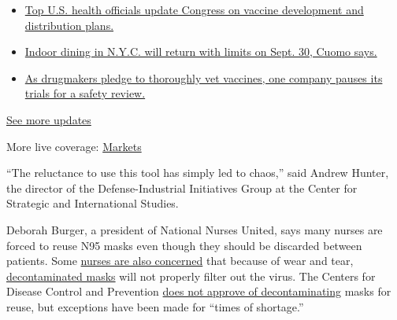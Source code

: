 \begin{itemize}
\tightlist
\item
  \href{https://www.nytimes3xbfgragh.onion/2020/09/09/world/covid-19-coronavirus.html?action=click\&pgtype=Article\&state=default\&region=MAIN_CONTENT_1\&context=storylines_live_updates\#link-279e24e2}{Top
  U.S. health officials update Congress on vaccine development and
  distribution plans.}
\item
  \href{https://www.nytimes3xbfgragh.onion/2020/09/09/world/covid-19-coronavirus.html?action=click\&pgtype=Article\&state=default\&region=MAIN_CONTENT_1\&context=storylines_live_updates\#link-792ae257}{Indoor
  dining in N.Y.C. will return with limits on Sept. 30, Cuomo says.}
\item
  \href{https://www.nytimes3xbfgragh.onion/2020/09/09/world/covid-19-coronavirus.html?action=click\&pgtype=Article\&state=default\&region=MAIN_CONTENT_1\&context=storylines_live_updates\#link-5b0bf0d1}{As
  drugmakers pledge to thoroughly vet vaccines, one company pauses its
  trials for a safety review.}
\end{itemize}

\href{https://www.nytimes3xbfgragh.onion/2020/09/09/world/covid-19-coronavirus.html?action=click\&pgtype=Article\&state=default\&region=MAIN_CONTENT_1\&context=storylines_live_updates}{See
more updates}

More live coverage:
\href{https://www.nytimes3xbfgragh.onion/live/2020/09/09/business/stock-market-today-coronavirus?action=click\&pgtype=Article\&state=default\&region=MAIN_CONTENT_1\&context=storylines_live_updates}{Markets}

``The reluctance to use this tool has simply led to chaos,'' said Andrew
Hunter, the director of the Defense-Industrial Initiatives Group at the
Center for Strategic and International Studies.

Deborah Burger, a president of National Nurses United, says many nurses
are forced to reuse N95 masks even though they should be discarded
between patients. Some
\href{https://www.nytimes3xbfgragh.onion/2020/07/08/health/coronavirus-masks-ppe-doc.html}{nurses
are also concerned} that because of wear and tear,
\href{https://www.nytimes3xbfgragh.onion/2020/04/11/business/coronavirus-n95-mask-decontaminating-reuse.html}{decontaminated
masks} will not properly filter out the virus. The Centers for Disease
Control and Prevention
\href{https://www.cdc.gov/coronavirus/2019-ncov/hcp/ppe-strategy/decontamination-reuse-respirators.html}{does
not approve of decontaminating} masks for reuse, but exceptions have
been made for ``times of shortage.''

